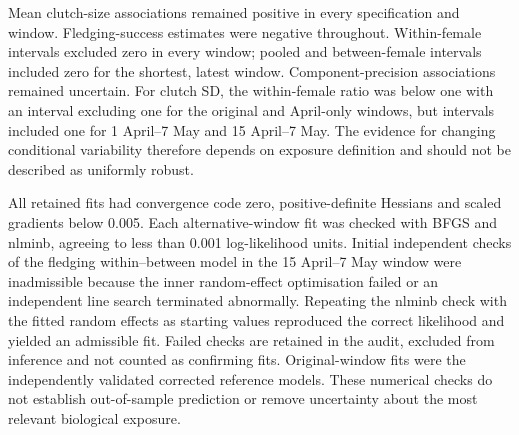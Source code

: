 \documentclass{article}
\begin{document}
\begin{table}[!ht]\centering\scriptsize\singlespacing
\caption{AIC for models fitted to identical records within each trait. The last column is within--between minus pooled AIC. These descriptive comparisons do not select a causal exposure window.}\label{tab:window-aic}
\end{table}

Mean clutch-size associations remained positive in every specification and window. Fledging-success estimates were negative throughout. Within-female intervals excluded zero in every window; pooled and between-female intervals included zero for the shortest, latest window. Component-precision associations remained uncertain. For clutch SD, the within-female ratio was below one with an interval excluding one for the original and April-only windows, but intervals included one for 1 April--7 May and 15 April--7 May. The evidence for changing conditional variability therefore depends on exposure definition and should not be described as uniformly robust.

All retained fits had convergence code zero, positive-definite Hessians and scaled gradients below 0.005. Each alternative-window fit was checked with BFGS and nlminb, agreeing to less than 0.001 log-likelihood units. Initial independent checks of the fledging within--between model in the 15 April--7 May window were inadmissible because the inner random-effect optimisation failed or an independent line search terminated abnormally. Repeating the nlminb check with the fitted random effects as starting values reproduced the correct likelihood and yielded an admissible fit. Failed checks are retained in the audit, excluded from inference and not counted as confirming fits. Original-window fits were the independently validated corrected reference models. These numerical checks do not establish out-of-sample prediction or remove uncertainty about the most relevant biological exposure.
\end{document}

